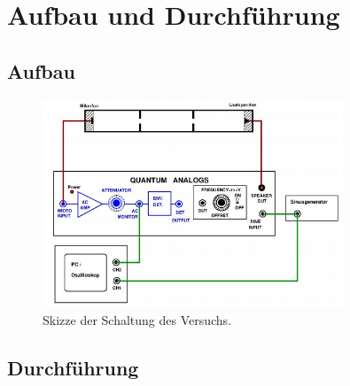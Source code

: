\section{Aufbau und Durchführung}
\label{sec:auf_durch}

\subsection{Aufbau}
\label{sec:aufbau}

\begin{figure}[H]
    \centering
    \includegraphics[width=0.8\textwidth]{build/Schaltung.PNG}
    \caption{Skizze der Schaltung des Versuchs. \cite{Anleitung}}
    \label{fig:aufbau}
\end{figure}

\subsection{Durchführung}
\label{sec:durchfuehrung}
